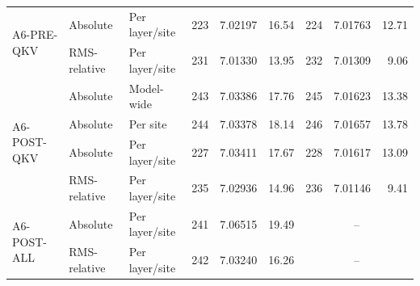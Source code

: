 \begin{longtable}{l l l r r r r r r}
\midrule
\multirow{2}{*}{A6-PRE-QKV} & Absolute & Per layer/site & 223 & 7.02197 & 16.54 & 224 & 7.01763 & 12.71 \\*
 & RMS-relative & Per layer/site & 231 & 7.01330 & 13.95 & 232 & 7.01309 & 9.06 \\
\midrule
\multirow{4}{*}{A6-POST-QKV} & Absolute & Model-wide & 243 & 7.03386 & 17.76 & 245 & 7.01623 & 13.38 \\*
 & Absolute & Per site & 244 & 7.03378 & 18.14 & 246 & 7.01657 & 13.78 \\*
 & Absolute & Per layer/site & 227 & 7.03411 & 17.67 & 228 & 7.01617 & 13.09 \\*
 & RMS-relative & Per layer/site & 235 & 7.02936 & 14.96 & 236 & 7.01146 & 9.41 \\
\midrule
\multirow{2}{*}{A6-POST-ALL} & Absolute & Per layer/site & 241 & 7.06515 & 19.49 & \multicolumn{3}{c}{--} \\*
 & RMS-relative & Per layer/site & 242 & 7.03240 & 16.26 & \multicolumn{3}{c}{--} \\
\end{longtable}
\endgroup
